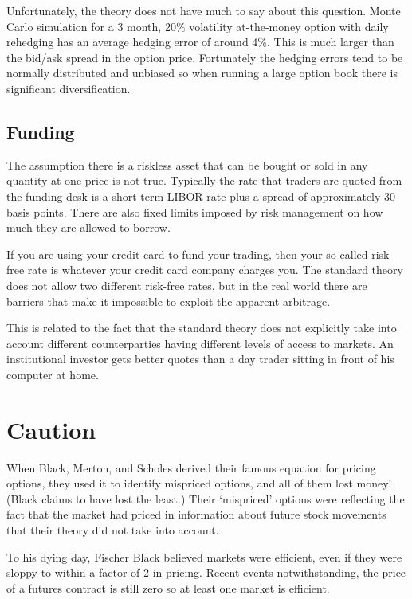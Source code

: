 Unfortunately, the theory does not have much to say about this
question. Monte Carlo simulation for a 3 month, 20\% volatility
at-the-money option with daily rehedging has an average hedging error of
around 4\%. This is much larger than the bid/ask spread in the option
price. Fortunately the hedging errors tend to be normally distributed
and unbiased so when running a large option book there is significant
diversification.

\subsection{Funding}
The assumption there is a riskless asset that can be bought or sold in
any quantity at one price is not true. Typically the rate that traders
are quoted from the funding desk is a short term LIBOR rate plus a spread
of approximately 30 basis points.  There are also fixed limits imposed
by risk management on how much they are allowed to borrow.


If you are using your credit card to fund your trading, then your
so-called risk-free rate is whatever your credit card company charges
you. The standard theory does not allow two different risk-free rates,
but in the real world there are barriers that make it impossible to
exploit the apparent arbitrage.

This is related to the fact that the standard theory does not explicitly
take into account different counterparties having different levels of
access to markets. An institutional investor gets better quotes than a
day trader sitting in front of his computer at home.

\section{Caution}
When Black, Merton, and Scholes derived their famous equation for pricing
options, they used it to identify mispriced options, and all of them lost
money! (Black claims to have lost the least.) Their `mispriced' options
were reflecting the fact that the market had priced in information about
future stock movements that their theory did not take into account.

To his dying day, Fischer Black believed markets were efficient, even
if they were sloppy to within a factor of 2 in pricing.  Recent events
notwithstanding, the price of a futures contract is still zero so at
least one market is efficient.

